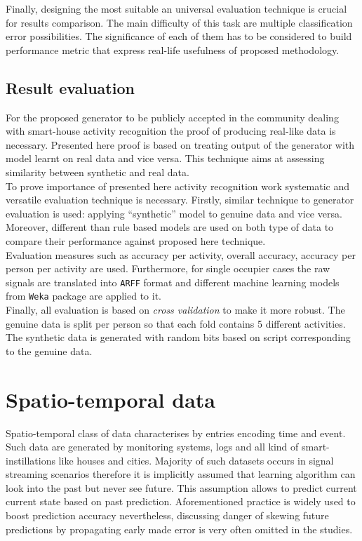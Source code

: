 \documentclass[12pt, a4paper, pdflatex, leqno, twoside, openright]{report}
\begin{document}
Finally, designing the most suitable an universal evaluation technique is crucial for results comparison. The main difficulty of this task are multiple classification error possibilities. The significance of each of them has to be considered to build performance metric that express real-life usefulness of proposed methodology.

\section{Result evaluation}
For the proposed generator to be publicly accepted in the community dealing with smart-house activity recognition the proof of producing real-like data is necessary. Presented here proof is based on treating output of the generator with model learnt on real data and vice versa. This technique aims at assessing similarity between synthetic and real data.\\

To prove importance of presented here activity recognition work systematic and versatile evaluation technique is necessary. Firstly, similar technique to generator evaluation is used: applying ``synthetic'' model to genuine data and vice versa. Moreover, different than rule based models are used on both type of data to compare their performance against proposed here technique.\\
Evaluation measures such as accuracy per activity, overall accuracy, accuracy per person per activity are used. Furthermore, for single occupier cases the raw signals are translated into \texttt{ARFF} format and different machine learning models from \texttt{Weka} package are applied to it.\\
Finally, all evaluation is based on \emph{cross validation} to make it more robust. The genuine data is split per person so that each fold contains 5 different activities. The synthetic data is generated with random bits based on script corresponding to the genuine data.


\chapter{Spatio-temporal data\label{ch:stData}}
Spatio-temporal class of data characterises by entries encoding time and event. Such data are generated by monitoring systems, logs and all kind of smart-instillations like houses and cities. Majority of such datasets occurs in signal streaming scenarios therefore it is implicitly assumed that learning algorithm can look into the past but never see future. This assumption allows to predict current current state based on past prediction. Aforementioned practice is widely used to boost prediction accuracy nevertheless, discussing danger of skewing future predictions by propagating early made error is very often omitted in the studies.
\end{document}
